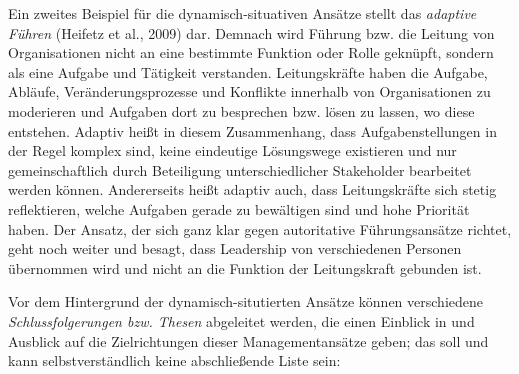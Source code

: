 \documentclass[
  letterpaper,
]{book}
\begin{document}
Ein zweites Beispiel für die dynamisch-situativen Ansätze stellt das
\emph{adaptive Führen} (Heifetz et al., 2009) dar. Demnach wird Führung
bzw. die Leitung von Organisationen nicht an eine bestimmte Funktion
oder Rolle geknüpft, sondern als eine Aufgabe und Tätigkeit verstanden.
Leitungskräfte haben die Aufgabe, Abläufe, Veränderungsprozesse und
Konflikte innerhalb von Organisationen zu moderieren und Aufgaben dort
zu besprechen bzw. lösen zu lassen, wo diese entstehen. Adaptiv heißt in
diesem Zusammenhang, dass Aufgabenstellungen in der Regel komplex sind,
keine eindeutige Lösungswege existieren und nur gemeinschaftlich durch
Beteiligung unterschiedlicher Stakeholder bearbeitet werden können.
Andererseits heißt adaptiv auch, dass Leitungskräfte sich stetig
reflektieren, welche Aufgaben gerade zu bewältigen sind und hohe
Priorität haben. Der Ansatz, der sich ganz klar gegen autoritative
Führungsansätze richtet, geht noch weiter und besagt, dass Leadership
von verschiedenen Personen übernommen wird und nicht an die Funktion der
Leitungskraft gebunden ist.

Vor dem Hintergrund der dynamisch-situtierten Ansätze können
verschiedene \emph{Schlussfolgerungen bzw. Thesen} abgeleitet werden,
die einen Einblick in und Ausblick auf die Zielrichtungen dieser
Managementansätze geben; das soll und kann selbstverständlich keine
abschließende Liste sein:
\end{document}

